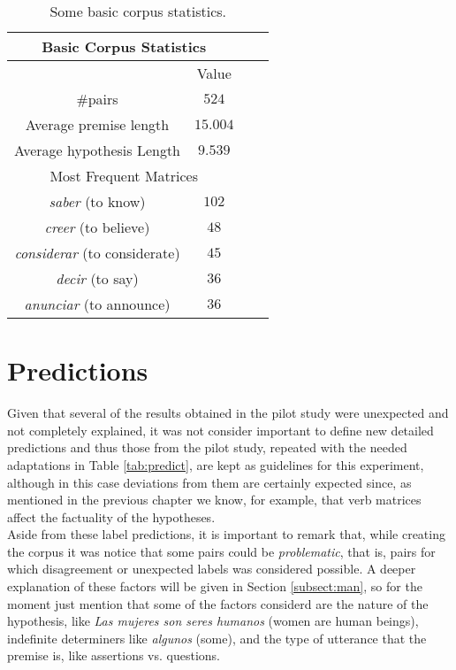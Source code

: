 \begin{table}
\centering
\begin{tabular}{|c|c|c|c|}
\hline
\multicolumn{2}{|c|}{Basic Corpus Statistics}\\\hline
                      & Value\\\hline 
\#pairs & $524$ \\\hline
Average premise length &$15.004$\\\hline
Average hypothesis Length & $9.539$\\\hline
\multicolumn{2}{|c|}{Most Frequent Matrices}\\\hline
\textit{saber} (to know)  & $102$\\\hline
\textit{creer} (to believe) & $48$\\\hline
\textit{considerar} (to considerate) & $45$\\\hline
\textit{decir}  (to say) & $36$\\\hline
\textit{anunciar} (to announce) & $36$\\\hline
\end{tabular}
\caption{Some basic corpus statistics.}\label{tab:corstats}
\label{tab:basstats}
\end{table}

\section{Predictions}
\label{sect:pred}
Given that several of the results obtained in the pilot study were unexpected and not completely explained, it was not consider important to define new detailed predictions and thus those from the pilot study, repeated with the needed adaptations in Table \ref{tab:predict}, are kept as guidelines for this experiment, although in this case deviations from them are certainly expected since, as mentioned in the previous chapter we know, for example, that verb matrices affect the factuality of the hypotheses.\\ 

Aside from these label predictions, it is important to remark that, while creating the corpus it was notice that some pairs could be \textit{problematic}, that is, pairs for which disagreement or unexpected labels was considered possible. A deeper explanation of these factors will be given in Section \ref{subsect:man}, so for the moment just mention that some of the factors considerd are the nature of the hypothesis, like \textit{Las mujeres son seres humanos} (women are human beings), indefinite determiners like \textit{algunos} (some), and the type of utterance that the premise is, like assertions vs. questions.\\

